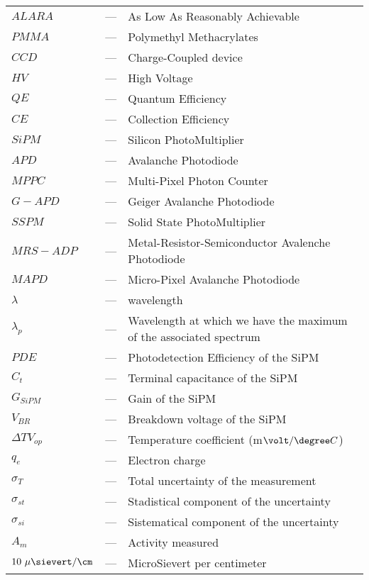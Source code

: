 \begin{longtable}{p{25mm} c p{120mm} }
$ALARA$ & --- & As Low As Reasonably Achievable\\
$PMMA$ & --- & Polymethyl Methacrylates\\
$CCD$ & --- & Charge-Coupled device\\
$HV$ & --- & High Voltage\\
$QE$ & --- & Quantum Efficiency\\
$CE$ & --- & Collection Efficiency\\
$SiPM$ & --- & Silicon PhotoMultiplier\\
$APD$ & --- & Avalanche Photodiode\\
$MPPC$ & --- & Multi-Pixel Photon Counter\\
$G-APD$ & --- & Geiger Avalanche Photodiode\\
$SSPM$ & --- & Solid State PhotoMultiplier\\
$MRS-ADP$ & --- & Metal-Resistor-Semiconductor Avalenche Photodiode\\
$MAPD$ & --- & Micro-Pixel Avalanche Photodiode\\
$\lambda$ & --- & wavelength\\
$\lambda_p$ & --- & Wavelength at which we have the maximum of the
\newline associated spectrum\\
$PDE$ & --- & Photodetection Efficiency of the SiPM\\
$C_t$ & --- & Terminal capacitance of the SiPM\\
$G_{SiPM}$ & --- & Gain of the SiPM\\
$V_{BR}$ & --- & Breakdown voltage of the SiPM\\
$\Delta TV_{op}$ & --- & Temperature coefficient (m$\volt/\degree C$)\\
$q_{e}$ & --- & Electron charge\\
$\sigma_{T}$ & --- & Total uncertainty of the measurement\\
$\sigma_{st}$ & --- & Stadistical component of the uncertainty\\
$\sigma_{si}$ & --- & Sistematical component of the uncertainty\\
$A_{m}$ & --- & Activity measured\\
$10~\mu\sievert/\cm$ & --- & MicroSievert per centimeter\\



\end{longtable}

